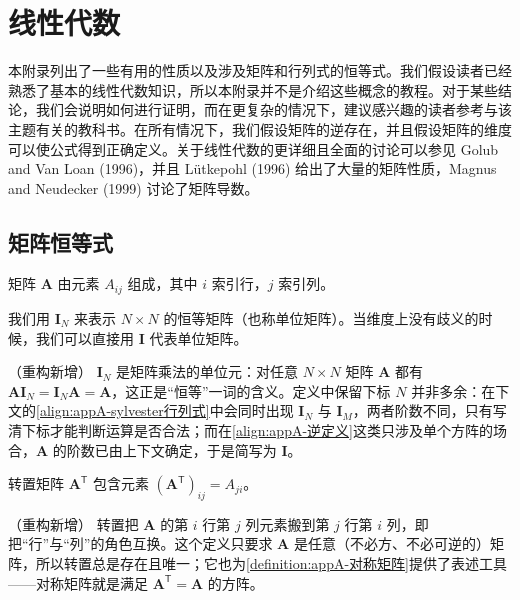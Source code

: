 \documentclass[../main.tex]{subfiles}
\begin{document}

\chapter{线性代数}\label{chapter:appA-线性代数}

本附录列出了一些有用的性质以及涉及矩阵和行列式的恒等式。我们假设读者已经熟悉了基本的线性代数知识，所以本附录并不是介绍这些概念的教程。对于某些结论，我们会说明如何进行证明，而在更复杂的情况下，建议感兴趣的读者参考与该主题有关的教科书。在所有情况下，我们假设矩阵的逆存在，并且假设矩阵的维度可以使公式得到正确定义。关于线性代数的更详细且全面的讨论可以参见 Golub and Van Loan (1996)，并且 Lütkepohl (1996) 给出了大量的矩阵性质，Magnus and Neudecker (1999) 讨论了矩阵导数。

\section{矩阵恒等式}\label{section:appA-矩阵恒等式}

矩阵 $\bm{A}$ 由元素 $A_{ij}$ 组成，其中 $i$ 索引行，$j$ 索引列。

\begin{definition}[恒等矩阵]\label{definition:appA-恒等矩阵}
我们用 $\bm{I}_{N}$ 来表示 $N\times N$ 的恒等矩阵（也称单位矩阵）。当维度上没有歧义的时候，我们可以直接用 $\bm{I}$ 代表单位矩阵。
\end{definition}

\begin{remark}（重构新增）
$\bm{I}_{N}$ 是矩阵乘法的单位元：对任意 $N\times N$ 矩阵 $\bm{A}$ 都有 $\bm{A}\bm{I}_{N}=\bm{I}_{N}\bm{A}=\bm{A}$，这正是“恒等”一词的含义。定义中保留下标 $N$ 并非多余：在下文的\eqref{align:appA-sylvester行列式}中会同时出现 $\bm{I}_{N}$ 与 $\bm{I}_{M}$，两者阶数不同，只有写清下标才能判断运算是否合法；而在\eqref{align:appA-逆定义}这类只涉及单个方阵的场合，$\bm{A}$ 的阶数已由上下文确定，于是简写为 $\bm{I}$。
\end{remark}

\begin{definition}[转置]\label{definition:appA-转置}
转置矩阵 $\bm{A}^{\mathsf{T}}$ 包含元素 $(\bm{A}^{\mathsf{T}})_{ij}=A_{ji}$。
\end{definition}

\begin{remark}（重构新增）
转置把 $\bm{A}$ 的第 $i$ 行第 $j$ 列元素搬到第 $j$ 行第 $i$ 列，即把“行”与“列”的角色互换。这个定义只要求 $\bm{A}$ 是任意（不必方、不必可逆的）矩阵，所以转置总是存在且唯一；它也为\cref{definition:appA-对称矩阵}提供了表述工具——对称矩阵就是满足 $\bm{A}^{\mathsf{T}}=\bm{A}$ 的方阵。
\end{remark}
\end{document}
